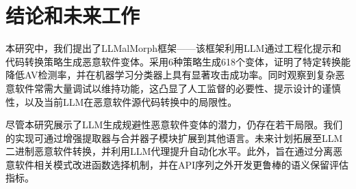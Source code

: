 \chapter{结论和未来工作}
本研究中，我们提出了LLMalMorph框架——该框架利用LLM通过工程化提示和代码转换策略生成恶意软件变体。采用6种策略生成618个变体，证明了特定转换能降低AV检测率，并在机器学习分类器上具有显著攻击成功率。同时观察到复杂恶意软件常需大量调试以维持功能，这凸显了人工监督的必要性、提示设计的谨慎性，以及当前LLM在恶意软件源代码转换中的局限性。

尽管本研究展示了LLM生成规避性恶意软件变体的潜力，仍存在若干局限。我们的实现可通过增强提取器与合并器子模块扩展到其他语言。未来计划拓展至LLM二进制恶意软件转换，并利用LLM代理提升自动化水平。此外，旨在通过分离恶意软件相关模式改进函数选择机制，并在API序列之外开发更鲁棒的语义保留评估指标。